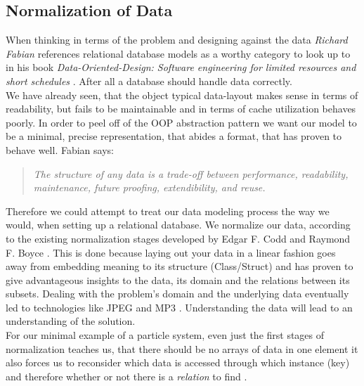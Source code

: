 \subsection{Normalization of Data}
When thinking in terms of the problem and designing against the data \textit{Richard Fabian} references relational database models as a worthy category to look up to in his book \textit{Data-Oriented-Design: Software engineering for limited resources and short schedules} . After all a database should handle data correctly.\\
We have already seen, that the object typical data-layout makes sense in terms of readability, but fails to be maintainable and in terms of cache utilization behaves poorly. In order to peel off of the OOP abstraction pattern we want our model to be a minimal, precise representation, that abides a format, that has proven to behave well. Fabian says:
\begin{quote}
	\textit{The structure of any data is a trade-off between performance, readability, maintenance, future proofing, extendibility, and reuse.} 
\end{quote}
Therefore we could attempt to treat our data modeling process the way we would, when setting up a relational database. We normalize our data, according to the existing normalization stages developed by Edgar F. Codd and Raymond F. Boyce . This is done because laying out your data in a linear fashion goes away from embedding meaning to its structure (Class/Struct)  and has proven to give advantageous insights to the data, its domain and the relations between its subsets. Dealing with the problem's domain and the underlying data eventually led to technologies like JPEG and MP3 . Understanding the data will lead to an understanding of the solution.\\
For our minimal example of a particle system, even just the first stages of normalization teaches us, that there should be no arrays of data in one element  it also forces us to reconsider which data is accessed through which instance (key) and therefore whether or not there is a \textit{relation} to find .\\
